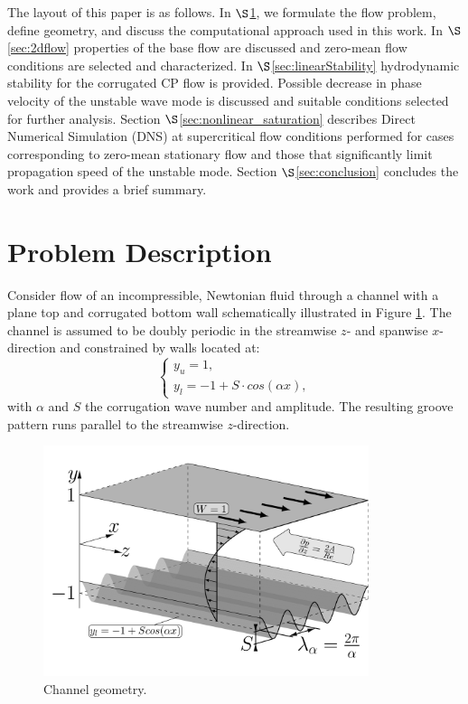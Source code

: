 \documentclass[lineno]{jfm}
\begin{document}
The layout of this paper is as follows. In $\S$\ref{sec:problemDes}, we formulate the flow problem, define geometry, and discuss the computational approach used in this work. In $\S$\ref{sec:2dflow} properties of the base flow are discussed and zero-mean flow conditions are selected and characterized.
In $\S$\ref{sec:linearStability}  hydrodynamic stability for the corrugated CP flow is provided.
Possible decrease in phase velocity of the unstable wave mode is discussed and suitable conditions selected for further analysis.
Section $\S$\ref{sec:nonlinear_saturation} describes Direct Numerical Simulation (DNS) at supercritical flow conditions performed for cases corresponding to zero-mean stationary flow and those that significantly limit propagation speed of the unstable mode.
Section $\S$\ref{sec:conclusion} concludes the work and provides a brief summary.

\section{Problem Description}\label{sec:problemDes}
Consider flow of an incompressible, Newtonian fluid through a channel with a plane top and corrugated bottom wall schematically illustrated in Figure \ref{fig:geom1}.
The channel is assumed to be doubly periodic in the streamwise $z$- and spanwise $x$-direction and constrained by walls located at:
\begin{equation}
\begin{cases}
y_{u} = 1,  \\
y_{l}= -1 + S\cdot cos(\alpha x),
\end{cases}
\label{eq:wall}
\end{equation}
with $\alpha$ and $S$ the corrugation wave number and amplitude. The resulting groove pattern runs parallel to the streamwise $z$-direction.

 \begin{figure}
 \centering
 	\includegraphics[width=0.85\textwidth]{figure2.png}  
 	\caption{Channel geometry.}
 	\label{fig:geom1}
 \end{figure}
\end{document}
